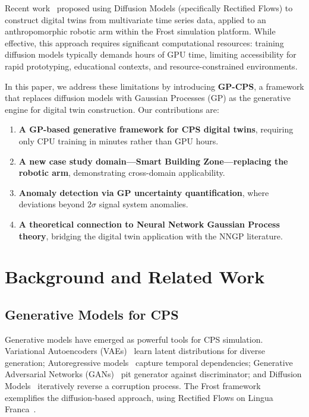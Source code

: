 \documentclass[conference]{IEEEtran}
\begin{document}
Recent work~\cite{turco2025} proposed using Diffusion Models (specifically Rectified Flows) to construct digital twins from multivariate time series data, applied to an anthropomorphic robotic arm within the Frost simulation platform. While effective, this approach requires significant computational resources: training diffusion models typically demands hours of GPU time, limiting accessibility for rapid prototyping, educational contexts, and resource-constrained environments.

In this paper, we address these limitations by introducing \textbf{GP-CPS}, a framework that replaces diffusion models with Gaussian Processes (GP) as the generative engine for digital twin construction. Our contributions are:

\begin{enumerate}
\item \textbf{A GP-based generative framework for CPS digital twins}, requiring only CPU training in minutes rather than GPU hours.
\item \textbf{A new case study domain---Smart Building Zone---replacing the robotic arm}, demonstrating cross-domain applicability.
\item \textbf{Anomaly detection via GP uncertainty quantification}, where deviations beyond $2\sigma$ signal system anomalies.
\item \textbf{A theoretical connection to Neural Network Gaussian Process theory}, bridging the digital twin application with the NNGP literature.
\end{enumerate}

\section{Background and Related Work}
\label{sec:background}

\subsection{Generative Models for CPS}
Generative models have emerged as powerful tools for CPS simulation. Variational Autoencoders (VAEs)~\cite{kingma2013} learn latent distributions for diverse generation; Autoregressive models~\cite{oord2016} capture temporal dependencies; Generative Adversarial Networks (GANs)~\cite{goodfellow2014} pit generator against discriminator; and Diffusion Models~\cite{ho2020} iteratively reverse a corruption process. The Frost framework~\cite{turco2025,turco2025frost} exemplifies the diffusion-based approach, using Rectified Flows on Lingua Franca~\cite{lohstroh2021}.
\end{document}

